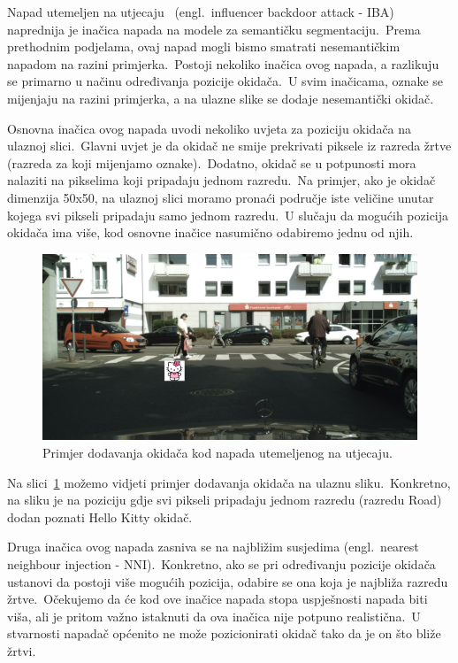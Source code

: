 \documentclass[times, utf8, seminar, numeric]{fer}
\begin{document}
Napad utemeljen na utjecaju~\cite{lan2023influencer} (engl.\ influencer backdoor attack - IBA) naprednija je inačica napada na modele za semantičku segmentaciju.\ 
Prema prethodnim podjelama, ovaj napad mogli bismo smatrati nesemantičkim napadom na razini primjerka.\ 
Postoji nekoliko inačica ovog napada, a razlikuju se primarno u načinu određivanja pozicije okidača.\ 
U svim inačicama, oznake se mijenjaju na razini primjerka, a na ulazne slike se dodaje nesemantički okidač.\ 
  
Osnovna inačica ovog napada uvodi nekoliko uvjeta za poziciju okidača na ulaznoj slici.\ 
Glavni uvjet je da okidač ne smije prekrivati piksele iz razreda žrtve (razreda za koji mijenjamo oznake).\ 
Dodatno, okidač se u potpunosti mora nalaziti na pikselima koji pripadaju jednom razredu.\ 
Na primjer, ako je okidač dimenzija 50x50, na ulaznoj slici moramo pronaći područje iste veličine unutar kojega svi pikseli pripadaju samo jednom razredu.\ 
U slučaju da mogućih pozicija okidača ima više, kod osnovne inačice nasumično odabiremo jednu od njih.\ 

\begin{figure}[htb]
    \centering
    \includegraphics[scale=0.75]{./Slike/iba.png}
    \caption{Primjer dodavanja okidača kod napada utemeljenog na utjecaju.}
    \label{fig:iba}
\end{figure}

Na slici~\ref{fig:iba} možemo vidjeti primjer dodavanja okidača na ulaznu sliku.\ 
Konkretno, na sliku je na poziciju gdje svi pikseli pripadaju jednom razredu (razredu Road) dodan poznati Hello Kitty okidač.\ 
  
Druga inačica ovog napada zasniva se na najbližim susjedima (engl.\ nearest neighbour injection - NNI).\ 
Konkretno, ako se pri određivanju pozicije okidača ustanovi da postoji više mogućih pozicija, odabire se ona koja je najbliža razredu žrtve.\ 
Očekujemo da će kod ove inačice napada stopa uspješnosti napada biti viša, ali je pritom važno istaknuti da ova inačica nije potpuno realistična.\ 
U stvarnosti napadač općenito ne može pozicionirati okidač tako da je on što bliže žrtvi.\ 
  
\end{document}
